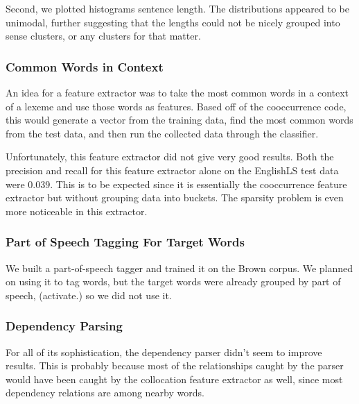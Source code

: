 \documentclass{article}
\begin{document}
Second, we plotted histograms sentence length. The distributions appeared to be unimodal, further suggesting that the lengths could not be nicely grouped into sense clusters, or any clusters for that matter.

\subsubsection{Common Words in Context}
An idea for a feature extractor was to take the most common words in a context of a lexeme and use those words as features. Based off of the cooccurrence code, this would generate a vector from the training data, find the most common words from the test data, and then run the collected data through the classifier.

Unfortunately, this feature extractor did not give very good results. Both the precision and recall for this feature extractor alone on the EnglishLS test data were 0.039. This is to be expected since it is essentially the cooccurrence feature extractor but without grouping data into buckets. The sparsity problem is even more noticeable in this extractor.

\subsubsection{Part of Speech Tagging For Target Words}
We built a part-of-speech tagger and trained it on the Brown corpus. We planned on using it to tag words, but the target words were already grouped by part of speech, (activate.) so we did not use it.


\subsubsection{Dependency Parsing}

For all of its sophistication, the dependency parser didn't seem to improve results.  This is probably because most of the relationships caught by the parser would have been caught by the collocation feature extractor as well, since most dependency relations are among nearby words.
\end{document}
